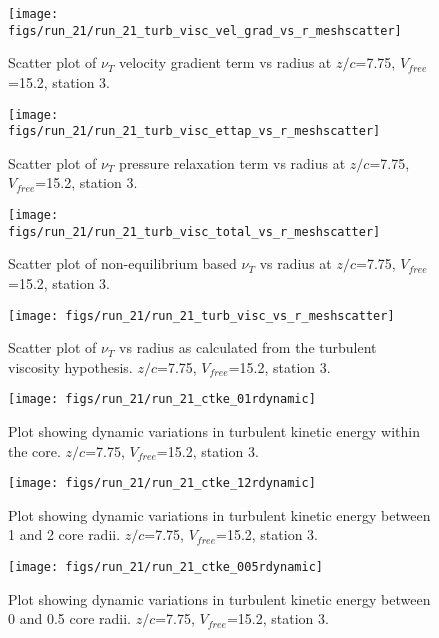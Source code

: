 \begin{figure}[H]
\centering
\texttt{[image: figs/run\_21/run\_21\_turb\_visc\_vel\_grad\_vs\_r\_meshscatter]}
\caption{Scatter plot of $\nu_T$ velocity gradient term vs radius at $z/c$=7.75, $V_{free}$=15.2, station 3.}
\end{figure}


\begin{figure}[H]
\centering
\texttt{[image: figs/run\_21/run\_21\_turb\_visc\_ettap\_vs\_r\_meshscatter]}
\caption{Scatter plot of $\nu_T$ pressure relaxation term vs radius at $z/c$=7.75, $V_{free}$=15.2, station 3.}
\end{figure}


\begin{figure}[H]
\centering
\texttt{[image: figs/run\_21/run\_21\_turb\_visc\_total\_vs\_r\_meshscatter]}
\caption{Scatter plot of non-equilibrium based $\nu_T$ vs radius at $z/c$=7.75, $V_{free}$=15.2, station 3.}
\end{figure}


\begin{figure}[H]
\centering
\texttt{[image: figs/run\_21/run\_21\_turb\_visc\_vs\_r\_meshscatter]}
\caption{Scatter plot of $\nu_T$ vs radius as calculated from the turbulent viscosity hypothesis. $z/c$=7.75, $V_{free}$=15.2, station 3.}
\end{figure}


\begin{figure}[H]
\centering
\texttt{[image: figs/run\_21/run\_21\_ctke\_01rdynamic]}
\caption{Plot showing dynamic variations in turbulent kinetic energy within the core. $z/c$=7.75, $V_{free}$=15.2, station 3.}
\end{figure}


\begin{figure}[H]
\centering
\texttt{[image: figs/run\_21/run\_21\_ctke\_12rdynamic]}
\caption{Plot showing dynamic variations in turbulent kinetic energy between 1 and 2 core radii. $z/c$=7.75, $V_{free}$=15.2, station 3.}
\end{figure}


\begin{figure}[H]
\centering
\texttt{[image: figs/run\_21/run\_21\_ctke\_005rdynamic]}
\caption{Plot showing dynamic variations in turbulent kinetic energy between 0 and 0.5 core radii. $z/c$=7.75, $V_{free}$=15.2, station 3.}
\end{figure}


